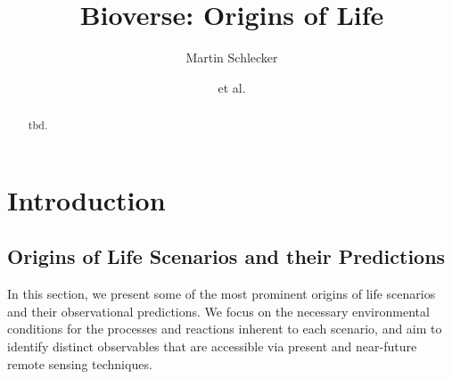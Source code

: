 \documentclass[twocolumn,twocolappendix,linenumbers]{aastex631}
\begin{document}
\title{Bioverse: Origins of Life}

\author{Martin Schlecker}
\author{et al.}

\begin{abstract}
    tbd.
\end{abstract}

\section{Introduction}
\label{sec:intro}

\subsection{Origins of Life Scenarios and their Predictions}\label{sec:predictions}
\label{sec:ool_scenarios}
In this section, we present some of the most prominent origins of life scenarios and their observational predictions.
We focus on the necessary environmental conditions for the processes and reactions inherent to each scenario, and aim to identify distinct observables that are accessible via present and near-future remote sensing techniques.
\end{document}
